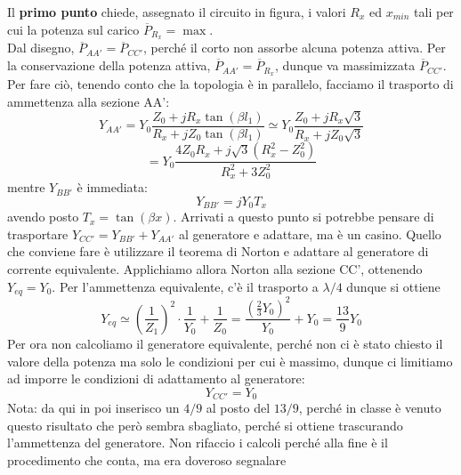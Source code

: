 \documentclass{book}
\begin{document}
        Il \textbf{primo punto} chiede, assegnato il circuito in figura, i valori $R_{x}$ ed $x_{min}$ tali per cui
        la potenza sul carico $\overline{P}_{R_{x}}=\max$. \\
        Dal disegno, $\overline{P}_{AA'}=\overline{P}_{CC'}$, perché il corto non assorbe alcuna potenza attiva. Per la conservazione 
        della potenza attiva, $\overline{P}_{AA'}=\overline{P}_{R_{x}}$, dunque va massimizzata $\overline{P}_{CC'}$.
        Per fare ciò, tenendo conto che la topologia è in parallelo, facciamo il trasporto di ammettenza alla sezione AA':
        \begin{equation}
            Y_{AA'}=Y_{0}\frac{Z_{0}+jR_{x}\tan(\beta l_{1})}{R_{x}+jZ_{0}\tan(\beta l_{1})} \simeq Y_{0} \frac{Z_{0}+jR_{x}\sqrt{3}}{R_{x}+jZ_{0}\sqrt{3}}
        \end{equation}
        \begin{equation}
            = Y_{0}\frac{4Z_{0}R_{x}+j\sqrt{3}(R_{x} ^{2}-Z_{0} ^{2})}{R_{x} ^{2}+3Z_{0} ^{2}}
        \end{equation}
        mentre $Y_{BB'}$ è immediata:
        \begin{equation}
            Y_{BB'}=jY_{0}T_{x}
        \end{equation}
        avendo posto $T_{x}=\tan(\beta x)$. Arrivati a questo punto si potrebbe pensare di trasportare $Y_{CC'}=Y_{BB'}+Y_{AA'}$ al generatore 
        e adattare, ma è un casino. Quello che conviene fare è utilizzare il teorema di Norton e adattare al generatore di corrente equivalente.
        Applichiamo allora Norton alla sezione CC', ottenendo $Y_{eq}=Y_{0}$. Per l'ammettenza equivalente, c'è il trasporto a $\lambda /4$ dunque si ottiene
        \begin{equation}
            Y_{eq} \simeq (\frac{1}{Z_{1}})^{2}\cdot \frac{1}{Y_{0}} + \frac{1}{Z_{0}} = \frac{(\frac{2}{3}Y_{0})^{2}}{Y_{0}} +Y_{0}= \frac{13}{9}Y_{0} 
        \end{equation}
        Per ora non calcoliamo il generatore equivalente, perché non ci è stato chiesto il valore della potenza ma solo le condizioni per cui 
        è massimo, dunque ci limitiamo ad imporre le condizioni di adattamento al generatore:
        \begin{equation}
            Y_{CC'}=Y_{0}
        \end{equation}
        Nota: da qui in poi inserisco un $4/9$ al posto del $13/9$, perché in classe è venuto questo risultato che però sembra sbagliato, perché
        si ottiene trascurando l'ammettenza del generatore. Non rifaccio i calcoli perché alla fine è il procedimento che conta, ma era doveroso segnalare
\end{document}
